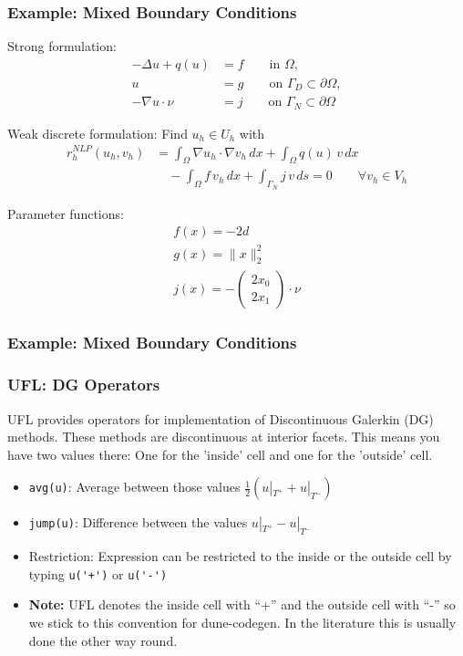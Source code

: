 \documentclass[aspectratio=169,11pt]{beamer}
\theoremstyle{definition}
\begin{document}
\begin{frame}
  \frametitle{Example: Mixed Boundary Conditions}
  \small

  Strong formulation:
  \begin{align*}
    -\Delta u + q(u) & = f \qquad\text{in $\Omega$}, \\
    u &= g \qquad\text{on $\Gamma_D\subset\partial\Omega$}, \\
    -\nabla u \cdot \nu &= j \qquad\text{on $\Gamma_N\subset\partial\Omega$}
  \end{align*}

  Weak discrete formulation: Find $u_h \in U_h$ with
  \begin{align*}
    r_h^{NLP}(u_h, v_h)
    & = \int_\Omega \nabla u_h \cdot \nabla v_h \, dx
      + \int_\Omega q(u) \, v \, dx \\
    &\quad - \int_\Omega f \, v_h \, dx
      + \int_{\Gamma_N} j \, v \, ds
      = 0 \qquad \forall v_h \in V_h
  \end{align*}

  Parameter functions:
  \begin{align*}
    f(x) = -2d \\
    g(x) = \| x \|_2^2\\
    j(x) = -
    \begin{pmatrix}
      2x_0 \\ 2x_1
    \end{pmatrix}
    \cdot \nu
  \end{align*}
\end{frame}

\begin{frame}
  \frametitle{Example: Mixed Boundary Conditions}
  
\end{frame}

\begin{frame}[fragile]
  \frametitle{UFL: DG Operators} UFL provides operators for implementation of
  Discontinuous Galerkin (DG) methods. These methods are discontinuous at
  interior facets. This means you have two values there: One for the 'inside'
  cell and one for the 'outside' cell.
  \begin{itemize}
  \item \lstinline{avg(u)}: Average between those values
    $\frac{1}{2}(u|_{T^+}+u|_{T^-})$
  \item \lstinline{jump(u)}: Difference between the values $u|_{T^+}-u|_{T^-}$
  \item Restriction: Expression can be restricted to the inside or the outside
    cell by typing \lstinline{u('+')} or \lstinline{u('-')}
  \item \textbf{Note:} UFL denotes the inside cell with ``+'' and the outside
    cell with ``-'' so we stick to this convention for dune-codegen. In the
    literature this is usually done the other way round.
  \end{itemize}
\end{frame}
\end{document}

